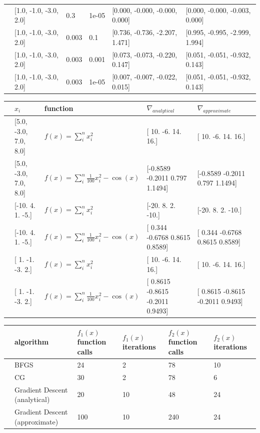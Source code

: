\documentclass[10pt]{article}
\begin{document}
\begin{table}
\begin{tabular}{llllll}
 &   [1.0, -1.0, -3.0, 2.0] &    0.3 &  1e-05 &  [0.000, -0.000, -0.000, 0.000] &   [0.000, -0.000, -0.003, 0.000] \\
 &   [1.0, -1.0, -3.0, 2.0] &  0.003 &    0.1 &  [0.736, -0.736, -2.207, 1.471] &   [0.995, -0.995, -2.999, 1.994] \\
 &   [1.0, -1.0, -3.0, 2.0] &  0.003 &  0.001 &  [0.073, -0.073, -0.220, 0.147] &   [0.051, -0.051, -0.932, 0.143] \\
 &   [1.0, -1.0, -3.0, 2.0] &  0.003 &  1e-05 &  [0.007, -0.007, -0.022, 0.015] &   [0.051, -0.051, -0.932, 0.143] \\
\bottomrule
\end{tabular}
\end{table}

\begin{table}
\begin{tabular}{llllll}
\toprule
{} &   $x_{i}$  &  function &   $\nabla_{analytical}$  & $\nabla_{approximate}$ \\
\midrule
&    [5.0, -3.0, 7.0, 8.0] & $f(x) = \sum_i^n x_i^2$ &  [ 10.  -6.  14.  16.] & [ 10.  -6.  14.  16.]\\
&    [5.0, -3.0, 7.0, 8.0] & $f(x) = \sum_i^n \frac{1}{100} x_i^2 - \cos(x)$ & [-0.8589 -0.2011  0.797   1.1494] &[-0.8589 -0.2011  0.797   1.1494] \\
&    [-10.   4.   1.  -5.] & $f(x) = \sum_i^n x_i^2$ &   [-20.   8.   2. -10.] &  [-20.   8.   2. -10.]\\
&    [-10.   4.   1.  -5.] & $f(x) = \sum_i^n \frac{1}{100} x_i^2 - \cos(x)$ &[ 0.344  -0.6768  0.8615  0.8589]&[ 0.344  -0.6768  0.8615  0.8589] \\
&    [ 1. -1. -3.  2.] & $f(x) = \sum_i^n x_i^2$ &  [ 10.  -6.  14.  16.] & [ 10.  -6.  14.  16.]\\
&    [ 1. -1. -3.  2.] & $f(x) = \sum_i^n \frac{1}{100} x_i^2 - \cos(x)$ & [ 0.8615 -0.8615 -0.2011  0.9493] & [ 0.8615 -0.8615 -0.2011  0.9493] \\
\bottomrule
\end{tabular}
\end{table}

\begin{table}
\begin{tabular}{llllll}
\toprule{} & algorithm & $f_1(x)$ function calls & $f_1(x)$ iterations &  $f_2(x)$ function calls &  $f_2(x)$ iterations \\
\midrule
  & BFGS & 24 & 2 & 78 & 10 \\
  & CG & 30 & 2 & 78 & 6 \\
  & Gradient Descent (analytical) & 20 & 10 & 48 & 24 \\ 
  & Gradient Descent (approximate) & 100 & 10 & 240 & 24 \\
\bottomrule
\end{tabular}
\end{table}
\end{document}
